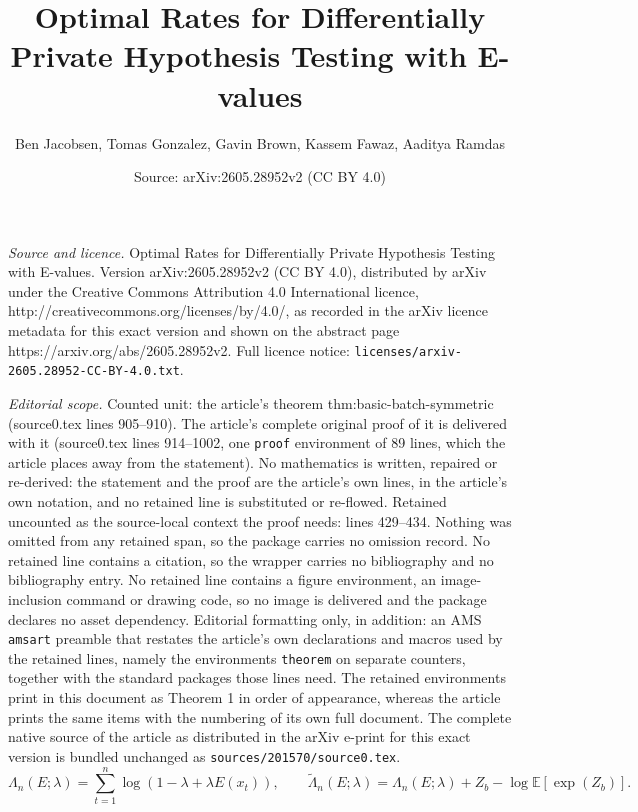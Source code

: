 \documentclass[10pt,a4paper]{amsart}
\title{Optimal Rates for Differentially Private Hypothesis Testing with E-values}
\author{Ben Jacobsen, Tomas Gonzalez, Gavin Brown, Kassem Fawaz, Aaditya Ramdas}
\date{Source: arXiv:2605.28952v2 (CC BY 4.0)}
\begin{document}
\maketitle

\noindent\emph{Source and licence.} Optimal Rates for Differentially Private Hypothesis Testing with E-values. Version arXiv:2605.28952v2 (CC BY 4.0), distributed by arXiv under the Creative Commons Attribution 4.0 International licence, http://creativecommons.org/licenses/by/4.0/, as recorded in the arXiv licence metadata for this exact version and shown on the abstract page https://arxiv.org/abs/2605.28952v2. Full licence notice: \texttt{licenses/arxiv-2605.28952-CC-BY-4.0.txt}.\par\smallskip

\noindent\textit{Editorial scope.} Counted unit: the article's theorem thm:basic-batch-symmetric (source0.tex lines 905--910). The article's complete original proof of it is delivered with it (source0.tex lines 914--1002, one \texttt{proof} environment of 89 lines, which the article places away from the statement). No mathematics is written, repaired or re-derived: the statement and the proof are the article's own lines, in the article's own notation, and no retained line is substituted or re-flowed.  Retained uncounted as the source-local context the proof needs: lines 429--434.  Nothing was omitted from any retained span, so the package carries no omission record.  No retained line contains a citation, so the wrapper carries no bibliography and no bibliography entry.  No retained line contains a figure environment, an image-inclusion command or drawing code, so no image is delivered and the package declares no asset dependency.  Editorial formatting only, in addition: an AMS \texttt{amsart} preamble that restates the article's own declarations and macros used by the retained lines, namely the environments \texttt{theorem} on separate counters, together with the standard packages those lines need.  The retained environments print in this document as Theorem 1 in order of appearance, whereas the article prints the same items with the numbering of its own full document.  The complete native source of the article as distributed in the arXiv e-print for this exact version is bundled unchanged as \texttt{sources/201570/source0.tex}.
    \begin{equation}
        \Lambda_n(E;\lambda) = \sum_{t = 1}^n \log (1-\lambda+\lambda  E(x_t)), 
        \qquad 
        \tilde \Lambda_n(E;\lambda) = \Lambda_n(E;\lambda) + Z_b - \log \mathbb{E}[\exp(Z_b)].
        \label{eq:batch_test_statistic}
    \end{equation}
\end{document}
